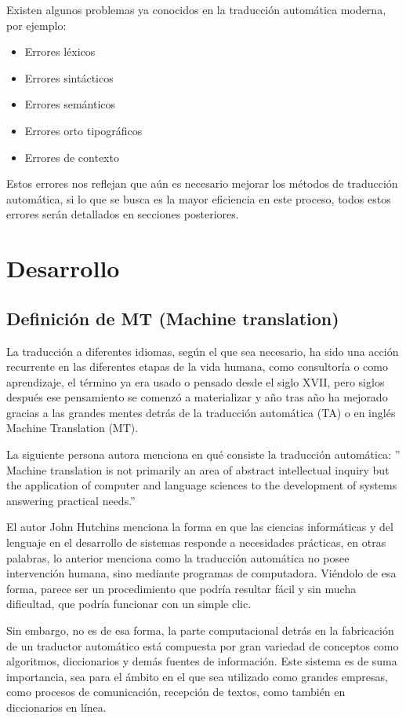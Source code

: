 \documentclass[conference]{IEEEtran}
\begin{document}
Existen algunos problemas ya conocidos en la traducción automática moderna, por ejemplo:

\begin{itemize}
    \item Errores léxicos
    \item Errores sintácticos
    \item Errores semánticos
    \item Errores orto tipográficos
    \item Errores de contexto
\end{itemize}


Estos errores nos reflejan que aún es necesario mejorar los métodos de traducción automática, si lo que se busca es la mayor eficiencia en este proceso, todos estos errores serán detallados en secciones posteriores.

\section{Desarrollo}
\subsection*{Definición de MT (Machine translation)}

La traducción a diferentes idiomas, según el que sea necesario, ha sido una acción recurrente en las diferentes etapas de la vida humana, como consultoría o como aprendizaje, el término ya era usado o pensado desde el siglo XVII, pero siglos después ese pensamiento se comenzó a materializar y año tras año ha mejorado gracias a las grandes mentes detrás de la traducción automática (TA) o en inglés Machine Translation (MT).

La siguiente persona autora menciona en qué consiste la traducción automática:
” Machine translation is not primarily an area of abstract intellectual inquiry but the application of computer and language sciences to the development of systems answering practical needs.”\cite{b3}

El autor John Hutchins menciona la forma en que las ciencias informáticas y del lenguaje en el desarrollo de sistemas responde a necesidades prácticas, en otras palabras, lo anterior menciona como la traducción automática no posee intervención humana, sino mediante programas de computadora. Viéndolo de esa forma, parece ser un procedimiento que podría resultar fácil y sin mucha dificultad, que podría funcionar con un simple clic.

Sin embargo, no es de esa forma, la parte computacional detrás en la fabricación de un traductor automático está compuesta por gran variedad de conceptos como algoritmos, diccionarios y demás fuentes de información. Este sistema es de suma importancia, sea para el ámbito en el que sea utilizado como grandes empresas, como procesos de comunicación, recepción de textos, como también en diccionarios en línea.
\end{document}
